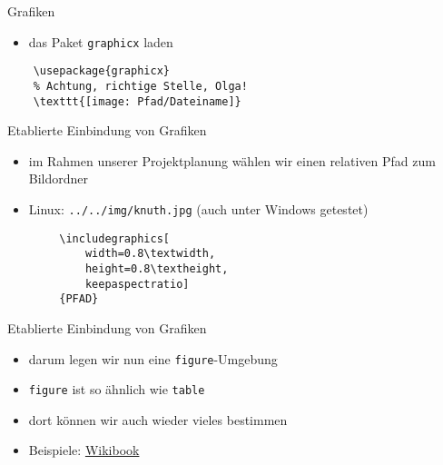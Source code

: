 \begin{frame}[fragile]{Grafiken}
    \begin{itemize}[<+->]
        \item das Paket \texttt{graphicx} laden
    \end{itemize}
    \begin{lstlisting}
    \usepackage{graphicx}
    % Achtung, richtige Stelle, Olga!
    \texttt{[image: Pfad/Dateiname]}
    \end{lstlisting}
\end{frame}

\begin{frame}[fragile]{Etablierte Einbindung von Grafiken}
    \begin{itemize}[<+->]
        \item im Rahmen unserer Projektplanung wählen wir einen relativen Pfad zum Bildordner
        \item Linux: \texttt{../../img/knuth.jpg} (auch unter Windows getestet)
    \end{itemize}
        \begin{lstlisting}
        \includegraphics[
            width=0.8\textwidth,
            height=0.8\textheight,
            keepaspectratio]
        {PFAD}
        \end{lstlisting}
\end{frame}

\begin{frame}[fragile]{Etablierte Einbindung von Grafiken}
    \begin{itemize}[<+->]
        \item darum legen wir nun eine \texttt{figure}-Umgebung
        \item \texttt{figure} ist so ähnlich wie \texttt{table}
        \item dort können wir auch wieder vieles bestimmen
        \item Beispiele: \href{https://en.wikibooks.org/wiki/LaTeX/Floats,_Figures_and_Captions}{Wikibook}
    \end{itemize}
\end{frame}
